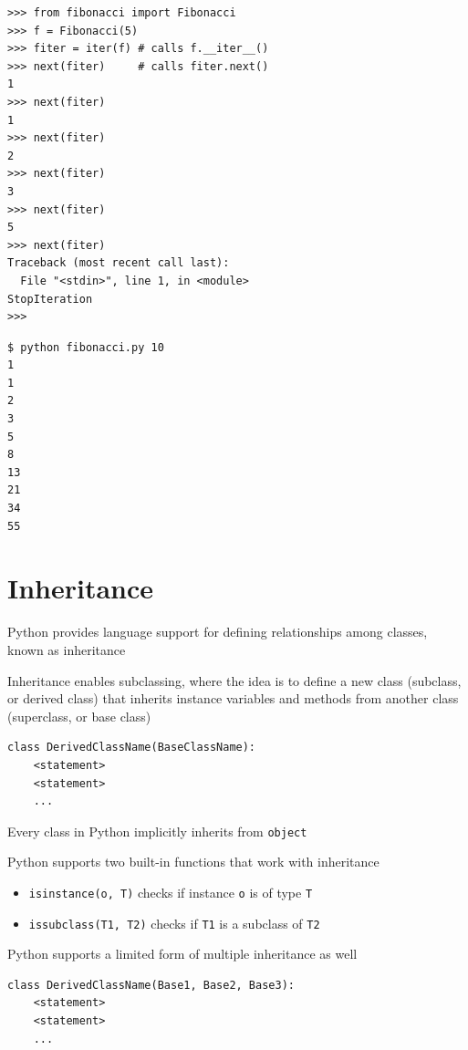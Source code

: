 \documentclass[8pt,a4paper,compress]{beamer}
\begin{document}
\begin{frame}[fragile]
\pause

\begin{lstlisting}[language={}]
>>> from fibonacci import Fibonacci
>>> f = Fibonacci(5)
>>> fiter = iter(f) # calls f.__iter__()
>>> next(fiter)     # calls fiter.next()
1
>>> next(fiter)
1
>>> next(fiter)
2
>>> next(fiter)
3
>>> next(fiter)
5
>>> next(fiter)
Traceback (most recent call last):
  File "<stdin>", line 1, in <module>
StopIteration
>>> 
\end{lstlisting}

\pause

\begin{lstlisting}[language={}]
$ python fibonacci.py 10
1
1
2
3
5
8
13
21
34
55
\end{lstlisting}
\end{frame}

\section{Inheritance}
\begin{frame}[fragile]
\pause

Python provides language support for defining relationships among classes, known as inheritance

\pause
\bigskip

Inheritance enables subclassing, where the idea is to define a new class (subclass, or derived class) that inherits instance variables and methods from another class (superclass, or base class)

\begin{lstlisting}[language={}]
class DerivedClassName(BaseClassName):
    <statement>
    <statement>
    ...
\end{lstlisting}

\pause
\bigskip

Every class in Python implicitly inherits from \lstinline{object}

\pause
\bigskip

Python supports two built-in functions that work with inheritance
\begin{itemize}
\item \lstinline{isinstance(o, T)} checks if instance \lstinline{o} is of type \lstinline{T}
\item \lstinline{issubclass(T1, T2)} checks if \lstinline{T1} is a subclass of \lstinline{T2}
\end{itemize}

\pause
\bigskip

Python supports a limited form of multiple inheritance as well

\begin{lstlisting}[language={}]
class DerivedClassName(Base1, Base2, Base3):
    <statement>
    <statement>
    ...
\end{lstlisting}
\end{frame}
\end{document}
